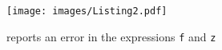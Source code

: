 

\begin{figure}[ht]
    \centering
    \texttt{[image: images/Listing2.pdf]}
    \caption{\chameleon{} reports an error in the expressions \texttt{f} and \texttt{z}}
    \label{fig:listing2}
\end{figure}




